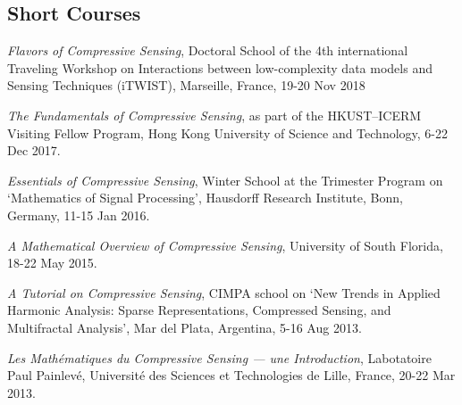 \documentclass[11pt]{article}
\begin{document}
\subsection{Short Courses}
\bitemize
\item {\em Flavors of Compressive Sensing}, Doctoral School of the 4th international Traveling Workshop on Interactions between low-complexity data models and Sensing Techniques (iTWIST),
Marseille, France, 19-20 Nov 2018
\item {\em The Fundamentals of Compressive Sensing}, as part of the
HKUST--ICERM Visiting Fellow Program,
Hong Kong University of Science and Technology, 6-22 Dec 2017.
\item {\em Essentials of Compressive Sensing}, Winter School at the Trimester Program on `Mathematics of Signal Processing', Hausdorff Research Institute,
Bonn, Germany, 11-15 Jan 2016.
\item {\em A Mathematical Overview of Compressive Sensing},
University of South Florida, 18-22 May 2015.
\item {\em A Tutorial on Compressive Sensing},
CIMPA school on `New Trends in Applied Harmonic Analysis:
Sparse Representations, Compressed Sensing, and Multifractal Analysis',
Mar del Plata, Argentina, 5-16  Aug 2013.
\item {\em Les Math\'ematiques du Compressive Sensing --- une Introduction},
Labotatoire Paul Painlev\'e, Universit\'e des Sciences et Technologies de Lille, France, 20-22 Mar 2013. 
\eitemize
\end{document}
